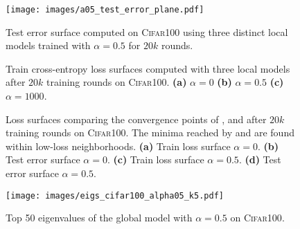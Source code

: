 \begin{figure}
    \centering
    \texttt{[image: images/a05\_test\_error\_plane.pdf]}
    \caption{Test error surface computed on \textsc{Cifar100} using three distinct local models trained with $\alpha=0.5$ for $20k$ rounds.}
    \label{fig:a05_client_conv}
\end{figure}

\captionsetup[subfloat]{font=scriptsize,labelformat=parens}
\begin{figure}[!t]
    \centering
    \caption{Train cross-entropy loss surfaces computed with three local models after $20k$ training rounds on \textsc{Cifar100}. \textbf{(a)} $\alpha=0$ \textbf{(b)} $\alpha=0.5$ \textbf{(c)} $\alpha=1000$.}
    \label{fig:train_loss_plane}
\end{figure}

\begin{figure}[!t]
    \centering
    \caption{Loss surfaces comparing the convergence points of \fedavg, \fedsam and \fedasam after $20k$ training rounds on \textsc{Cifar100}. The minima reached by \sam and \asam are found within low-loss neighborhoods. \textbf{(a)} Train loss surface $\alpha=0$. \textbf{(b)} Test error surface $\alpha=0$. \textbf{(c)} Train loss surface $\alpha=0.5$. \textbf{(d)} Test error surface $\alpha=0.5$. }
    \label{fig:convg_algs}
\end{figure}

\begin{figure}[!t]
    \centering
    \texttt{[image: images/eigs\_cifar100\_alpha05\_k5.pdf]}
    \caption{Top 50 eigenvalues of the global model with $\alpha=0.5$ on \textsc{Cifar100}.}
    \label{fig:a05_eigs}
\end{figure}

